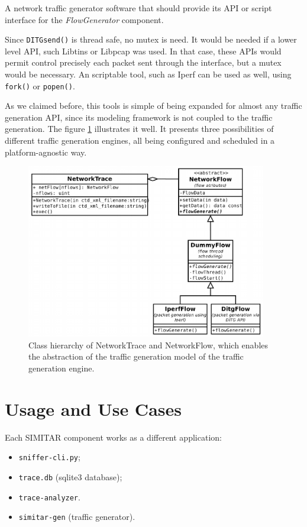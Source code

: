 A network traffic generator software that should provide its API or script interface for the \textit{FlowGenerator} component. 
 
Since \texttt{DITGsend()} is thread safe, no mutex is need. It would be needed if a lower level API, such Libtins or Libpcap was used. In that case, these APIs would permit control precisely each packet sent through the interface, but a mutex would be necessary. An scriptable tool, such as Iperf can be used as well, using \texttt{fork()} or \texttt{popen()}.

As we claimed before, this tools is simple of being expanded for almost any traffic generation API, since its modeling framework is not coupled to the traffic generation.
The figure \ref{fig:network-trace-flow-class-diagram} illustrates it well. It presents three possibilities of different traffic generation engines, all being configured and scheduled in a platform-agnostic way.

\begin{figure}[ht!]
    \centering
    \includegraphics[height=3.0in]{figures/ch3/trace-flow}
    \caption{Class hierarchy of NetworkTrace and NetworkFlow, which enables the abstraction of the traffic generation model of the traffic generation engine.}
    \label{fig:network-trace-flow-class-diagram}
\end{figure}


\section{Usage and Use Cases}

Each SIMITAR component works as a different application:

\begin{itemize}
	\item \texttt{sniffer-cli.py};
	\item \texttt{trace.db} (sqlite3 database);
	\item \texttt{trace-analyzer}.
	\item \texttt{simitar-gen} (traffic generator).
\end{itemize}


